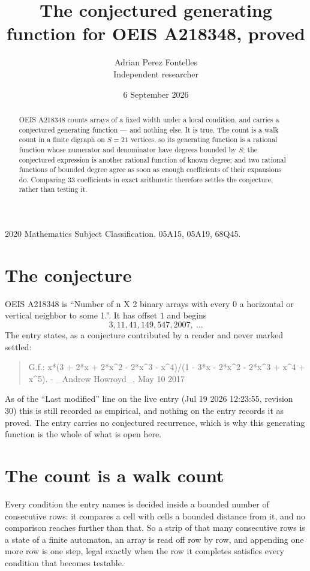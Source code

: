 \documentclass[11pt,a4paper]{article}
\title{The conjectured generating function for OEIS A218348, proved}
\author{Adrian Perez Fontelles\\ \small Independent researcher}
\date{6 September 2026}
\theoremstyle{plain}
\theoremstyle{definition}
\begin{document}
\maketitle

\begin{abstract}
OEIS A218348 counts arrays of a fixed width under a local condition, and carries a conjectured
generating function --- and nothing else. It is true. The count is a walk count in a finite
digraph on $S=21$ vertices, so its generating function is a rational function whose numerator
and denominator have degrees bounded by $S$; the conjectured expression is another rational
function of known degree; and two rational functions of bounded degree agree as soon as enough
coefficients of their expansions do. Comparing $33$ coefficients in exact arithmetic
therefore settles the conjecture, rather than testing it.
\end{abstract}

\noindent\small 2020 Mathematics Subject Classification. 05A15, 05A19, 68Q45.\normalsize

\section{The conjecture}

OEIS A218348 is ``Number of n X 2 binary arrays with every 0 a horizontal or vertical neighbor to some 1.''. It has offset $1$ and begins
\[
3, 11, 41, 149, 547, 2007,\ \dots
\]
The entry states, as a conjecture contributed by a reader and never marked settled:
\begin{quote}
G.f.: x*(3 + 2*x + 2*x\^{}2 - 2*x\^{}3 - x\^{}4)/(1 - 3*x - 2*x\^{}2 - 2*x\^{}3 + x\^{}4 + x\^{}5). - \_Andrew Howroyd\_, May 10 2017
\end{quote}
As of the ``Last modified'' line on the live entry (Jul 19 2026 12:23:55, revision 30) this is still
recorded as empirical, and nothing on the entry records it as proved. The entry carries no
conjectured recurrence, which is why this generating function is the whole of what is open
here.

\section{The count is a walk count}

Every condition the entry names is decided inside a bounded number of consecutive rows: it
compares a cell with cells a bounded distance from it, and no comparison reaches further than
that. So a strip of that many consecutive rows is a state of a finite automaton, an array is
read off row by row, and appending one more row is one step, legal exactly when the row it
completes satisfies every condition that becomes testable.
\end{document}
